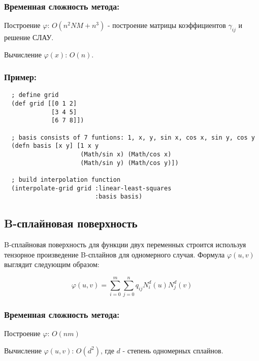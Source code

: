 \subsubsection{Временная сложность метода:}

Построение $\varphi$: $ O(n^2NM + n^3)$ - построение матрицы коэффициентов $\gamma_{ij}$ и решение СЛАУ.

Вычисление $\varphi(x)$: $O(n)$.

\subsubsection{Пример:}

\begin{verbatim}
  ; define grid
  (def grid [[0 1 2]
             [3 4 5]
             [6 7 8]])

  ; basis consists of 7 funtions: 1, x, y, sin x, cos x, sin y, cos y
  (defn basis [x y] [1 x y
                     (Math/sin x) (Math/cos x)
                     (Math/sin y) (Math/cos y)])

  ; build interpolation function
  (interpolate-grid grid :linear-least-squares
                         :basis basis)
\end{verbatim}



\subsection{B-сплайновая поверхность}

B-сплайновая поверхность для функции двух переменных строится используя тензорное произведение B-сплайнов для одномерного случая. Формула $\varphi(u, v)$ выглядит следующим образом:

\begin{equation}
  \varphi(u, v) = \sum_{i=0}^m \sum_{j=0}^n q_{ij} N^d_i(u)N^d_j(v)
\end{equation}

\subsubsection{Временная сложность метода:}

Построение $\varphi$: $O(n m)$

Вычисление $\varphi(u, v)$: $O(d^2)$, где $d$ - степень одномерных сплайнов.

